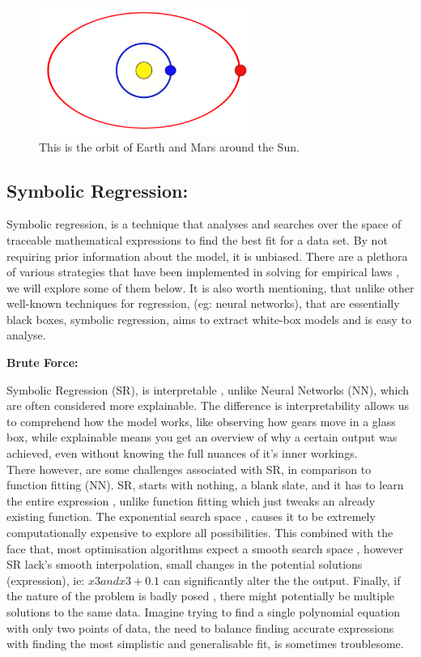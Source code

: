 \documentclass{article}
\begin{document}
\begin{figure}[h] 
    \centering
    \includegraphics[width=7cm]{Sun_Mars_Orbit} 
    \caption{This is the orbit of Earth and Mars around the Sun.}
    \label{fig:Orbit} 
\end{figure}


\subsection{Symbolic Regression: }

Symbolic regression, is a technique that analyses and searches over the space of traceable mathematical
expressions to find the best fit for a data set. By not requiring prior information about the model,
it is unbiased. There are a plethora of various strategies that have been implemented in solving for
empirical laws \cite{Schmidt22009}, we will explore some of them below. It is also worth mentioning, that unlike other
well-known techniques for regression, (eg: neural networks), that are essentially black boxes, symbolic
regression, aims to extract white-box models and is easy to analyse.\\

\begin{center} 
  \textbf {\Large  Brute Force:}
\end{center}
Symbolic Regression (SR), is interpretable \cite{Aldeia2022}, unlike Neural Networks (NN), which are often considered more explainable. The difference is interpretability allows us to comprehend how the model works,
like observing how gears move in a glass box, while explainable means you get an overview of why a
certain output was achieved, even without knowing the full nuances of it’s inner workings.\\

There however, are some challenges associated with SR, in comparison to function fitting (NN). SR,
starts with nothing, a blank slate, and it has to learn the entire expression \cite{Cranmer2020}, unlike function fitting
which just tweaks an already existing function. The exponential search space \cite{Worm2014} , causes it to be
extremely computationally expensive to explore all possibilities. This combined with the face that,
most optimisation algorithms expect a smooth search space \cite{Makke2024}, however SR lack’s smooth interpolation, small changes in the potential solutions (expression), ie: $ x3 and x3 + 0.1$ can significantly alter
the the output. Finally, if the nature of the problem is badly posed \cite{Rivero2022}, there might potentially be
multiple solutions to the same data. Imagine trying to find a single polynomial equation with only two
points of data, the need to balance finding accurate expressions with finding the most simplistic and
generalisable fit, is sometimes troublesome.\\
\end{document}

